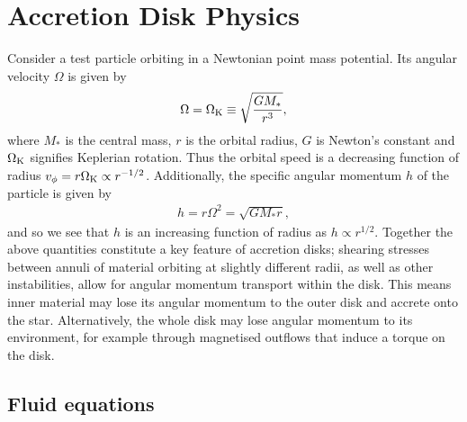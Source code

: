 \section{Accretion Disk Physics}


Consider a test particle orbiting in a Newtonian point mass potential. Its angular velocity $\Omega$ is given by
\begin{align}
    \Omega = \Omega_{\rm K} \equiv \sqrt{\frac{G M_*}{r^3}}, \label{eq:point_pot}
\end{align}
where $M_*$ is the central mass, $r$ is the orbital radius, $G$ is Newton's constant and $\Omega_{\rm K}$ signifies Keplerian rotation. 
Thus the orbital speed is a decreasing function of radius $v_\phi = r \Omega_{\rm K} \propto r^{-1/2}$.
Additionally, the specific angular momentum $h$ of the particle is given by
\begin{align}
    h = r \Omega^2 = \sqrt{G M_* r}, \label{eq:ang_mom}
\end{align}
and so we see that $h$ is an increasing function of radius as $h \propto r^{1/2}$.
Together the above quantities constitute a key feature of accretion disks; shearing stresses between annuli of material orbiting at slightly different radii, as well as other instabilities, allow for angular momentum transport within the disk. 
This means inner material may lose its angular momentum to the outer disk and accrete onto the star. 
Alternatively, the whole disk may lose angular momentum to its environment, for example through magnetised outflows that induce a torque on the disk.

\subsection{Fluid equations} \label{sec:fluid_eqns}


